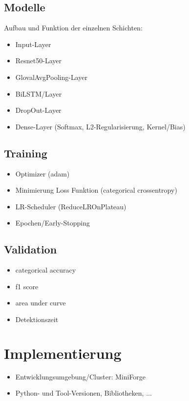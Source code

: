 \documentclass{article}
\begin{document}
    \subsection{Modelle}
    Aufbau und Funktion der einzelnen Schichten:
    \begin{itemize}
        \item Input-Layer
        \item Resnet50-Layer
        \item GlovalAvgPooling-Layer
        \item BiLSTM/Layer
        \item DropOut-Layer
        \item Dense-Layer (Softmax, L2-Regularisierung, Kernel/Bias)
    \end{itemize}
    \subsection{Training}
    \begin{itemize}
        \item Optimizer (adam)
        \item Minimierung Loss Funktion (categorical crossentropy)
        \item LR-Scheduler (ReduceLROnPlateau)
        \item Epochen/Early-Stopping
    \end{itemize}
    \subsection{Validation}
    \begin{itemize}
        \item categorical accuracy
        \item f1 score
        \item area under curve
        \item Detektionszeit
    \end{itemize}

    \newpage
    \section{Implementierung}
    \begin{itemize}
        \item Entwicklungsumgebung/Cluster: MiniForge
        \item Python- und Tool-Versionen, Bibliotheken, ... %
    \end{itemize}
\end{document}
